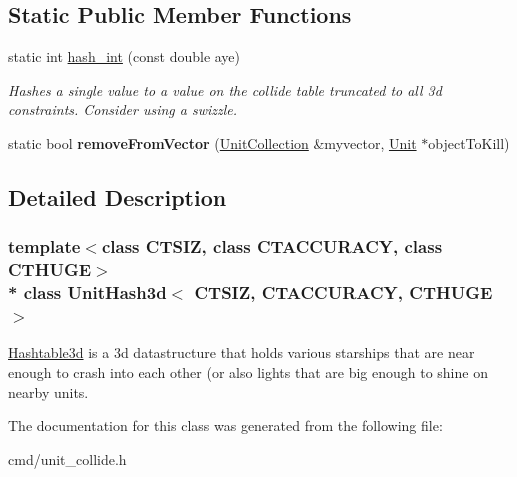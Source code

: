 \subsection*{Static Public Member Functions}
\begin{DoxyCompactItemize}
\item 
static int \hyperlink{classUnitHash3d_a5f79cda61ef485dddc9560ca9d5c10ca}{hash\+\_\+int} (const double aye)\hypertarget{classUnitHash3d_a5f79cda61ef485dddc9560ca9d5c10ca}{}\label{classUnitHash3d_a5f79cda61ef485dddc9560ca9d5c10ca}

\begin{DoxyCompactList}\small\item\em Hashes a single value to a value on the collide table truncated to all 3d constraints. Consider using a swizzle. \end{DoxyCompactList}\item 
static bool {\bfseries remove\+From\+Vector} (\hyperlink{classUnitCollection}{Unit\+Collection} \&myvector, \hyperlink{classUnit}{Unit} $\ast$object\+To\+Kill)\hypertarget{classUnitHash3d_ac10459b53ac63d2a08c6eb22c734b93e}{}\label{classUnitHash3d_ac10459b53ac63d2a08c6eb22c734b93e}

\end{DoxyCompactItemize}


\subsection{Detailed Description}
\subsubsection*{template$<$class C\+T\+S\+IZ, class C\+T\+A\+C\+C\+U\+R\+A\+CY, class C\+T\+H\+U\+GE$>$\\*
class Unit\+Hash3d$<$ C\+T\+S\+I\+Z, C\+T\+A\+C\+C\+U\+R\+A\+C\+Y, C\+T\+H\+U\+G\+E $>$}

\hyperlink{classHashtable3d}{Hashtable3d} is a 3d datastructure that holds various starships that are near enough to crash into each other (or also lights that are big enough to shine on nearby units. 

The documentation for this class was generated from the following file\+:\begin{DoxyCompactItemize}
\item 
cmd/unit\+\_\+collide.\+h\end{DoxyCompactItemize}
